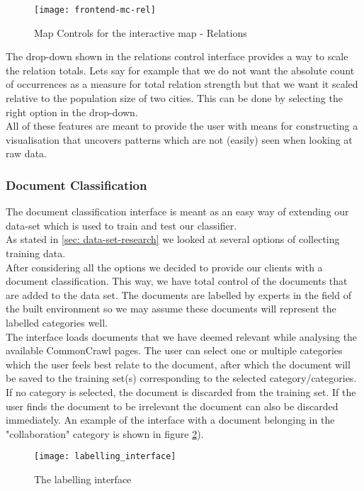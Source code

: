 \begin{figure}[H]
\centering
\texttt{[image: frontend-mc-rel]}
\caption{Map Controls for the interactive map - Relations}
\label{fig:frontend-mc-rel}
\end{figure}

The drop-down shown in the relations control interface provides a way to scale the relation totals. Lets say for example that we do not want the absolute count of occurrences as a measure for total relation strength but that we want it scaled relative to the population size of two cities. This can be done by selecting the right option in the drop-down.\\
All of these features are meant to provide the user with means for constructing a visualisation that uncovers patterns which are not (easily) seen when looking at raw data.
\subsubsection{Document Classification}
The document classification interface is meant as an easy way of extending our data-set which is used to train and test our classifier.\\
As stated in \ref{sec: data-set-research} we looked at several options of collecting training data.\\
After considering all the options we decided to provide our clients with a document classification. This way, we have total control of the documents that are added to the data set. The documents are labelled by experts in the field of the built environment so we may assume these documents will represent the labelled categories well. \\
The interface loads documents that we have deemed relevant while analysing the available CommonCrawl pages. The user can select one or multiple categories which the user feels best relate to the document, after which the document will be saved to the training set(s) corresponding to the selected category/categories. If no category is selected, the document is discarded from the training set. If the user finds the document to be irrelevant the document can also be discarded immediately. An example of the interface with a document belonging in the "collaboration" category is shown in figure \ref{fig:frontend-label}).
\begin{figure}[H]
\centering
\texttt{[image: labelling\_interface]}
\caption{The labelling interface}
\label{fig:frontend-label}
\end{figure}

